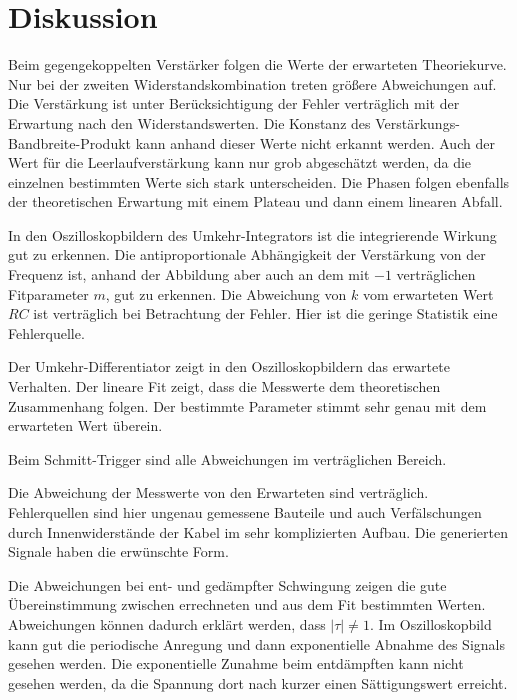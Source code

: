 \section{Diskussion}
\label{sec:Diskussion}

Beim gegengekoppelten Verstärker folgen die Werte der erwarteten Theoriekurve. Nur bei der zweiten Widerstandskombination treten größere Abweichungen auf. Die Verstärkung ist unter Berücksichtigung der Fehler verträglich mit der Erwartung nach den Widerstandswerten. Die Konstanz des Verstärkungs-Bandbreite-Produkt kann anhand dieser Werte nicht erkannt werden. Auch der Wert für die Leerlaufverstärkung kann nur grob abgeschätzt werden, da die einzelnen bestimmten Werte sich stark unterscheiden. Die Phasen folgen ebenfalls der theoretischen Erwartung mit einem Plateau und dann einem linearen Abfall.

In den Oszilloskopbildern des Umkehr-Integrators ist die integrierende Wirkung gut zu erkennen. Die antiproportionale Abhängigkeit der Verstärkung von der Frequenz ist, anhand der Abbildung aber auch an dem mit $-1$ verträglichen Fitparameter $m$, gut zu erkennen. Die Abweichung von $k$ vom erwarteten Wert $RC$ ist verträglich bei Betrachtung der Fehler. Hier ist die geringe Statistik eine Fehlerquelle.

Der Umkehr-Differentiator zeigt in den Oszilloskopbildern das erwartete Verhalten. Der lineare Fit zeigt, dass die Messwerte dem theoretischen Zusammenhang folgen. Der bestimmte Parameter stimmt sehr genau mit dem erwarteten Wert überein.

Beim Schmitt-Trigger sind alle Abweichungen im verträglichen Bereich.

Die Abweichung der Messwerte von den Erwarteten sind verträglich. Fehlerquellen sind hier ungenau gemessene Bauteile und auch Verfälschungen durch Innenwiderstände der Kabel im sehr komplizierten Aufbau. Die generierten Signale haben die erwünschte Form.

Die Abweichungen bei ent- und gedämpfter Schwingung zeigen die gute Übereinstimmung zwischen errechneten und aus dem Fit bestimmten Werten. Abweichungen können dadurch erklärt werden, dass $|\tau| \neq 1$. Im Oszilloskopbild kann gut die periodische Anregung und dann exponentielle Abnahme des Signals gesehen werden. Die exponentielle Zunahme beim entdämpften kann nicht gesehen werden, da die Spannung dort nach kurzer einen Sättigungswert erreicht.
